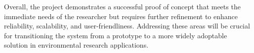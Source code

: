 Overall, the project demonstrates a successful proof of concept that meets the immediate needs of the researcher but requires further refinement to enhance reliability, scalability, and user-friendliness. Addressing these areas will be crucial for transitioning the system from a prototype to a more widely adoptable solution in environmental research applications.
